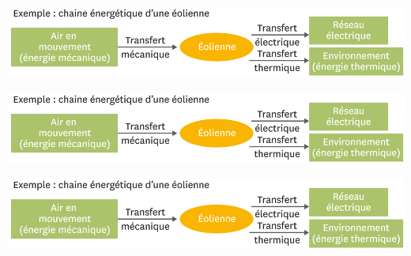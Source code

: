 \documentclass[12pt,a4paper]{article}
\begin{document}
\begin{center}
	\includegraphics[scale=0.5]{chaine}
\end{center}

\begin{center}
	\includegraphics[scale=0.5]{chaine}
\end{center}

\begin{center}
	\includegraphics[scale=0.5]{chaine}
\end{center}
\appendix

\end{document}
